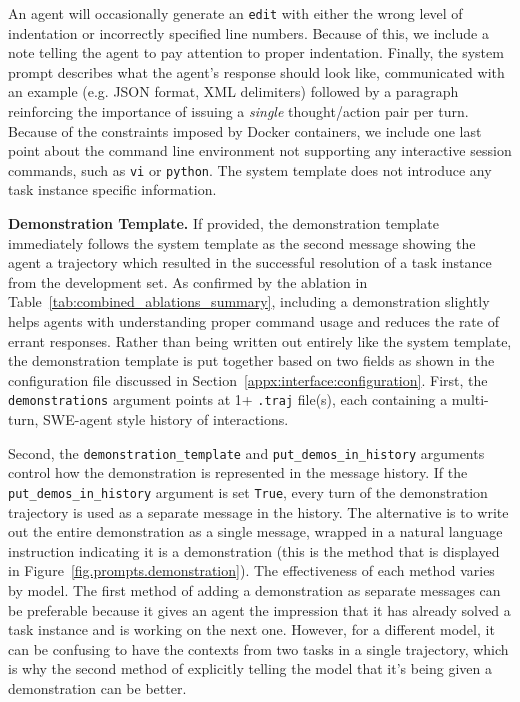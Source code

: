 

An agent will occasionally generate an \texttt{edit} with either the wrong level of indentation or incorrectly specified line numbers.
Because of this, we include a note telling the agent to pay attention to proper indentation.
Finally, the system prompt describes what the agent’s response should look like, communicated with an example (e.g. JSON format, XML delimiters) followed by a paragraph reinforcing the importance of issuing a \textit{single} thought/action pair per turn.
Because of the constraints imposed by Docker containers, we include one last point about the command line environment not supporting any interactive session commands, such as \texttt{vi} or \texttt{python}.
The system template does not introduce any task instance specific information.

\textbf{Demonstration Template.}
If provided, the demonstration template immediately follows the system template as the second message showing the agent a trajectory which resulted in the successful resolution of a task instance from the development set.
As confirmed by the ablation in Table~\ref{tab:combined_ablations_summary}, including a demonstration slightly helps agents with understanding proper command usage and reduces the rate of errant responses.
Rather than being written out entirely like the system template, the demonstration template is put together based on two fields as shown in the configuration file discussed in Section~\ref{appx:interface:configuration}.
First, the \texttt{demonstrations} argument points at 1+ \texttt{.traj} file(s), each containing a multi-turn, SWE-agent style history of interactions.

Second, the \texttt{demonstration\_template} and \texttt{put\_demos\_in\_history} arguments control how the demonstration is represented in the message history.
If the \texttt{put\_demos\_in\_history} argument is set \texttt{True}, every turn of the demonstration trajectory is used as a separate message in the history.
The alternative is to write out the entire demonstration as a single message, wrapped in a natural language instruction indicating it is a demonstration (this is the method that is displayed in Figure~\ref{fig.prompts.demonstration}).
The effectiveness of each method varies by model.
The first method of adding a demonstration as separate messages can be preferable because it gives an agent the impression that it has already solved a task instance and is working on the next one.
However, for a different model, it can be confusing to have the contexts from two tasks in a single trajectory, which is why the second method of explicitly telling the model that it’s being given a demonstration can be better.

